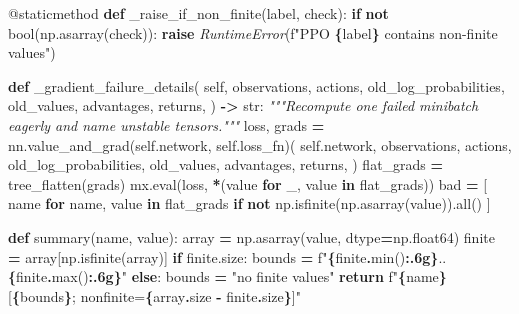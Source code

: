 \documentclass[
  american,
  11pt,
  letterpaper,
]{article}
\newenvironment{Shaded}{\begin{snugshade}}{\end{snugshade}}
\newcommand{\AttributeTok}[1]{\textcolor[rgb]{0.13,0.29,0.53}{#1}}
\newcommand{\BuiltInTok}[1]{#1}
\newcommand{\CommentTok}[1]{\textcolor[rgb]{0.56,0.35,0.01}{\textit{#1}}}
\newcommand{\ControlFlowTok}[1]{\textcolor[rgb]{0.13,0.29,0.53}{\textbf{#1}}}
\newcommand{\KeywordTok}[1]{\textcolor[rgb]{0.13,0.29,0.53}{\textbf{#1}}}
\newcommand{\NormalTok}[1]{#1}
\newcommand{\OperatorTok}[1]{\textcolor[rgb]{0.81,0.36,0.00}{\textbf{#1}}}
\newcommand{\PreprocessorTok}[1]{\textcolor[rgb]{0.56,0.35,0.01}{\textit{#1}}}
\newcommand{\SpecialCharTok}[1]{\textcolor[rgb]{0.81,0.36,0.00}{\textbf{#1}}}
\newcommand{\SpecialStringTok}[1]{\textcolor[rgb]{0.31,0.60,0.02}{#1}}
\newcommand{\StringTok}[1]{\textcolor[rgb]{0.31,0.60,0.02}{#1}}
\newcommand{\VariableTok}[1]{\textcolor[rgb]{0.00,0.00,0.00}{#1}}
\renewenvironment{Shaded}{\par\smallskip}{\par\smallskip}
\begin{document}
\begin{Shaded}
\begin{Highlighting}[]
    \AttributeTok{@staticmethod}
    \KeywordTok{def}\NormalTok{ \_raise\_if\_non\_finite(label, check):}
        \ControlFlowTok{if} \KeywordTok{not} \BuiltInTok{bool}\NormalTok{(np.asarray(check)):}
            \ControlFlowTok{raise} \PreprocessorTok{RuntimeError}\NormalTok{(}\SpecialStringTok{f"PPO }\SpecialCharTok{\{}\NormalTok{label}\SpecialCharTok{\}}\SpecialStringTok{ contains non{-}finite values"}\NormalTok{)}

    \KeywordTok{def}\NormalTok{ \_gradient\_failure\_details(}
        \VariableTok{self}\NormalTok{,}
\NormalTok{        observations,}
\NormalTok{        actions,}
\NormalTok{        old\_log\_probabilities,}
\NormalTok{        old\_values,}
\NormalTok{        advantages,}
\NormalTok{        returns,}
\NormalTok{    ) }\OperatorTok{{-}\textgreater{}} \BuiltInTok{str}\NormalTok{:}
        \CommentTok{"""Recompute one failed minibatch eagerly and name unstable tensors."""}
\NormalTok{        loss, grads }\OperatorTok{=}\NormalTok{ nn.value\_and\_grad(}\VariableTok{self}\NormalTok{.network, }\VariableTok{self}\NormalTok{.loss\_fn)(}
            \VariableTok{self}\NormalTok{.network,}
\NormalTok{            observations,}
\NormalTok{            actions,}
\NormalTok{            old\_log\_probabilities,}
\NormalTok{            old\_values,}
\NormalTok{            advantages,}
\NormalTok{            returns,}
\NormalTok{        )}
\NormalTok{        flat\_grads }\OperatorTok{=}\NormalTok{ tree\_flatten(grads)}
\NormalTok{        mx.}\BuiltInTok{eval}\NormalTok{(loss, }\OperatorTok{*}\NormalTok{(value }\ControlFlowTok{for}\NormalTok{ \_, value }\KeywordTok{in}\NormalTok{ flat\_grads))}
\NormalTok{        bad }\OperatorTok{=}\NormalTok{ [}
\NormalTok{            name }\ControlFlowTok{for}\NormalTok{ name, value }\KeywordTok{in}\NormalTok{ flat\_grads}
            \ControlFlowTok{if} \KeywordTok{not}\NormalTok{ np.isfinite(np.asarray(value)).}\BuiltInTok{all}\NormalTok{()}
\NormalTok{        ]}

        \KeywordTok{def}\NormalTok{ summary(name, value):}
\NormalTok{            array }\OperatorTok{=}\NormalTok{ np.asarray(value, dtype}\OperatorTok{=}\NormalTok{np.float64)}
\NormalTok{            finite }\OperatorTok{=}\NormalTok{ array[np.isfinite(array)]}
            \ControlFlowTok{if}\NormalTok{ finite.size:}
\NormalTok{                bounds }\OperatorTok{=} \SpecialStringTok{f"}\SpecialCharTok{\{}\NormalTok{finite}\SpecialCharTok{.}\BuiltInTok{min}\NormalTok{()}\SpecialCharTok{:.6g\}}\SpecialStringTok{..}\SpecialCharTok{\{}\NormalTok{finite}\SpecialCharTok{.}\BuiltInTok{max}\NormalTok{()}\SpecialCharTok{:.6g\}}\SpecialStringTok{"}
            \ControlFlowTok{else}\NormalTok{:}
\NormalTok{                bounds }\OperatorTok{=} \StringTok{"no finite values"}
            \ControlFlowTok{return} \SpecialStringTok{f"}\SpecialCharTok{\{}\NormalTok{name}\SpecialCharTok{\}}\SpecialStringTok{[}\SpecialCharTok{\{}\NormalTok{bounds}\SpecialCharTok{\}}\SpecialStringTok{; nonfinite=}\SpecialCharTok{\{}\NormalTok{array}\SpecialCharTok{.}\NormalTok{size }\OperatorTok{{-}}\NormalTok{ finite}\SpecialCharTok{.}\NormalTok{size}\SpecialCharTok{\}}\SpecialStringTok{]"}


\end{Highlighting}
\end{Shaded}
\end{document}
